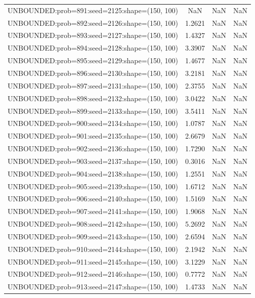 \begin{longtable}{lccc}
UNBOUNDED:prob=891:seed=2125:shape=(150, 100) &     NaN &   NaN &    NaN \\
UNBOUNDED:prob=892:seed=2126:shape=(150, 100) &  1.2621 &   NaN &    NaN \\
UNBOUNDED:prob=893:seed=2127:shape=(150, 100) &  1.4327 &   NaN &    NaN \\
UNBOUNDED:prob=894:seed=2128:shape=(150, 100) &  3.3907 &   NaN &    NaN \\
UNBOUNDED:prob=895:seed=2129:shape=(150, 100) &  1.4677 &   NaN &    NaN \\
UNBOUNDED:prob=896:seed=2130:shape=(150, 100) &  3.2181 &   NaN &    NaN \\
UNBOUNDED:prob=897:seed=2131:shape=(150, 100) &  2.3755 &   NaN &    NaN \\
UNBOUNDED:prob=898:seed=2132:shape=(150, 100) &  3.0422 &   NaN &    NaN \\
UNBOUNDED:prob=899:seed=2133:shape=(150, 100) &  3.5411 &   NaN &    NaN \\
UNBOUNDED:prob=900:seed=2134:shape=(150, 100) &  1.0787 &   NaN &    NaN \\
UNBOUNDED:prob=901:seed=2135:shape=(150, 100) &  2.6679 &   NaN &    NaN \\
UNBOUNDED:prob=902:seed=2136:shape=(150, 100) &  1.7290 &   NaN &    NaN \\
UNBOUNDED:prob=903:seed=2137:shape=(150, 100) &  0.3016 &   NaN &    NaN \\
UNBOUNDED:prob=904:seed=2138:shape=(150, 100) &  1.2551 &   NaN &    NaN \\
UNBOUNDED:prob=905:seed=2139:shape=(150, 100) &  1.6712 &   NaN &    NaN \\
UNBOUNDED:prob=906:seed=2140:shape=(150, 100) &  1.5169 &   NaN &    NaN \\
UNBOUNDED:prob=907:seed=2141:shape=(150, 100) &  1.9068 &   NaN &    NaN \\
UNBOUNDED:prob=908:seed=2142:shape=(150, 100) &  5.2692 &   NaN &    NaN \\
UNBOUNDED:prob=909:seed=2143:shape=(150, 100) &  2.6594 &   NaN &    NaN \\
UNBOUNDED:prob=910:seed=2144:shape=(150, 100) &  2.1942 &   NaN &    NaN \\
UNBOUNDED:prob=911:seed=2145:shape=(150, 100) &  3.1229 &   NaN &    NaN \\
UNBOUNDED:prob=912:seed=2146:shape=(150, 100) &  0.7772 &   NaN &    NaN \\
UNBOUNDED:prob=913:seed=2147:shape=(150, 100) &  1.4733 &   NaN &    NaN \\

\end{longtable}
